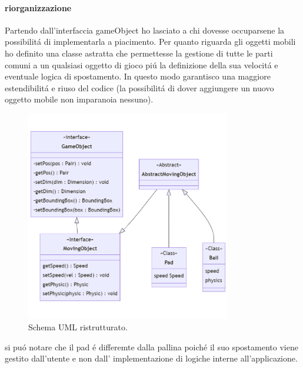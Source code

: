 \documentclass[a4paper,12pt]{report}
\begin{document}
\paragraph{riorganizzazione}
Partendo dall'interfaccia gameObject ho lasciato a chi dovesse occuparsene la possibilitá di implementarla a piacimento. Per quanto riguarda gli oggetti
mobili ho definito una classe astratta che permettesse la gestione di tutte le parti comuni a un qualsiasi oggetto di gioco piú la definizione della sua
velocitá e eventuale logica di spostamento.
In questo modo garantisco una maggiore estendibilitá e riuso del codice (la possibilitá di dover aggiungere un nuovo oggetto mobile non imparanoia nessuno).

\begin{figure}[H]
    \centering
    \includegraphics[width=0.8\textwidth]{images/RefactorGameEntity.png}
    \caption{Schema UML ristrutturato.}
\end{figure}

si puó notare che il pad é differemte dalla pallina poiché il suo spostamento viene gestito dall'utente e non dall'
implementazione di logiche interne all'applicazione.
\end{document}
